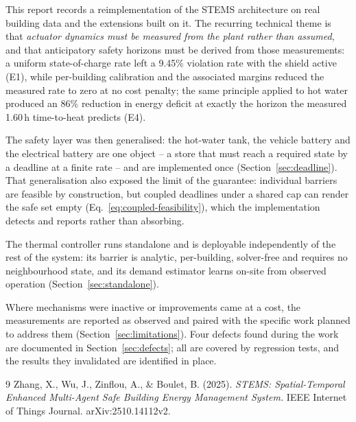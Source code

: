 \documentclass[11pt]{article}
\begin{document}
This report records a reimplementation of the STEMS architecture on real
building data and the extensions built on it. The recurring technical theme is
that \emph{actuator dynamics must be measured from the plant rather than
assumed}, and that anticipatory safety horizons must be derived from those
measurements: a uniform state-of-charge rate left a 9.45\% violation rate with
the shield active (E1), while per-building calibration and the associated margins
reduced the measured rate to zero at no cost penalty; the same principle applied
to hot water produced an 86\% reduction in energy deficit at exactly the horizon
the measured 1.60\,h time-to-heat predicts (E4).

The safety layer was then generalised: the hot-water tank, the vehicle battery
and the electrical battery are one object -- a store that must reach a required
state by a deadline at a finite rate -- and are implemented once
(Section~\ref{sec:deadline}). That generalisation also exposed the limit of the
guarantee: individual barriers are feasible by construction, but coupled
deadlines under a shared cap can render the safe set empty
(Eq.~\ref{eq:coupled-feasibility}), which the implementation detects and reports
rather than absorbing.

The thermal controller runs standalone and is deployable independently of the
rest of the system: its barrier is analytic, per-building, solver-free and
requires no neighbourhood state, and its demand estimator learns on-site from
observed operation (Section~\ref{sec:standalone}).

Where mechanisms were inactive or improvements came at a cost, the measurements
are reported as observed and paired with the specific work planned to address
them (Section~\ref{sec:limitations}). Four defects found during the work are
documented in Section~\ref{sec:defects}; all are covered by regression tests, and
the results they invalidated are identified in place.

\begin{thebibliography}{9}
Zhang, X., Wu, J., Zinflou, A., \& Boulet, B. (2025).
\textit{STEMS: Spatial-Temporal Enhanced Multi-Agent Safe Building Energy Management System.}
IEEE Internet of Things Journal. arXiv:2510.14112v2.
\end{thebibliography}
\end{document}
